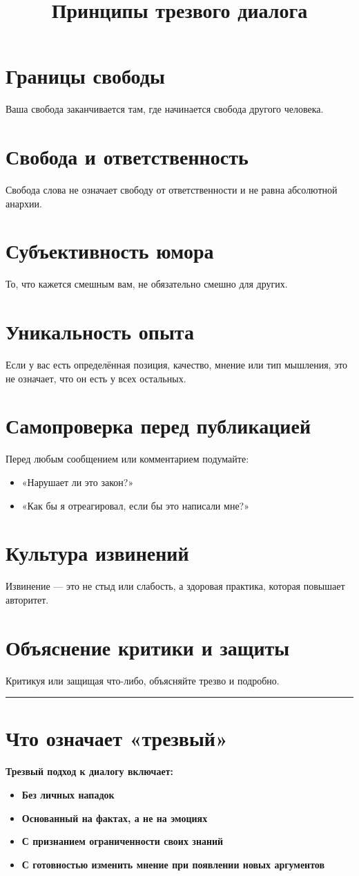 \documentclass{article}
\title{Принципы трезвого диалога}
\author{}
\date{}
\begin{document}
\maketitle
\section{Границы свободы}
Ваша свобода заканчивается там, где начинается свобода другого человека.
\section{Свобода и ответственность}
Свобода слова не означает свободу от ответственности и не равна абсолютной анархии.
\section{Субъективность юмора}
То, что кажется смешным вам, не обязательно смешно для других.
\section{Уникальность опыта}
Если у вас есть определённая позиция, качество, мнение или тип мышления, это не означает, что он есть у всех остальных.
\section{Самопроверка перед публикацией}
Перед любым сообщением или комментарием подумайте:
\begin{itemize}
    \item «Нарушает ли это закон?»
    \item «Как бы я отреагировал, если бы это написали мне?»
\end{itemize}
\section{Культура извинений}
Извинение — это не стыд или слабость, а здоровая практика, которая повышает авторитет.
\section{Объяснение критики и защиты}
Критикуя или защищая что-либо, объясняйте трезво и подробно.
\vspace{1cm}
\hrule
\vspace{0.5cm}
\section*{Что означает «трезвый»}
\textbf{Трезвый подход к диалогу включает:}
\begin{itemize}[label=--]
    \item \textbf{Без личных нападок}
    \item \textbf{Основанный на фактах, а не на эмоциях}
    \item \textbf{С признанием ограниченности своих знаний}
    \item \textbf{С готовностью изменить мнение при появлении новых аргументов}
\end{itemize}
\end{document}
